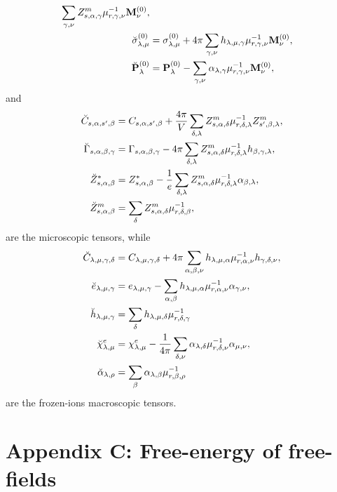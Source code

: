 \documentclass[12pt,a4paper]{article}
\begin{document}
{\begin{align}
\sum_{\gamma,\nu}
Z^m_{s,\alpha,\gamma} \mu^{-1}_{r,\gamma,\nu} {\bf M}^{(0)}_\nu, \\
\breve \sigma^{(0)}_{\lambda,\mu}&= \sigma^{(0)}_{\lambda,\mu}
+ 4 \pi \sum_{\gamma,\nu} h_{\lambda,\mu,\gamma} \mu^{-1}_{r,\gamma,\nu} 
{\bf M}^{(0)}_\nu, \\
\breve {\bf P}^{(0)}_\lambda&= {\bf P}^{(0)}_\lambda -
\sum_{\gamma,\nu} \alpha_{\lambda,\gamma} \mu^{-1}_{r,\gamma,\nu} 
{\bf M}^{(0)}_\nu, \\
\end{align}
and
\begin{align}
\breve C_{s,\alpha,s',\beta} &= C_{s,\alpha,s',\beta}+
{4 \pi \over V}  \sum_{\delta,\lambda} Z^m_{s,\alpha,\delta}
\mu^{-1}_{r,\delta,\lambda}Z^m_{s',\beta,\lambda},\\
\breve \Gamma_{s,\alpha,\beta,\gamma} &= \Gamma_{s,\alpha,\beta,\gamma}
- 4 \pi \sum_{\delta,\lambda} Z^m_{s,\alpha,\delta}
\mu^{-1}_{r,\delta,\lambda} h_{\beta,\gamma,\lambda}, \\
\breve Z^*_{s,\alpha,\beta} &= Z^*_{s,\alpha,\beta}
-{1\over e} \sum_{\delta,\lambda} Z^m_{s,\alpha,\delta} 
\mu^{-1}_{r,\delta,\lambda} \alpha_{\beta,\lambda}, \\
\breve Z^m_{s,\alpha,\beta} &= \sum_{\delta} Z^m_{s,\alpha,\delta} 
\mu^{-1}_{r,\delta,\beta}, 
\end{align}
are the microscopic tensors, while
\begin{align}
\breve C_{\lambda,\mu,\gamma,\delta} &=
C_{\lambda,\mu,\gamma,\delta} + 4 \pi \sum_{\alpha,\beta,\nu}
h_{\lambda,\mu,\alpha} \mu^{-1}_{r,\alpha,\nu} 
h_{\gamma,\delta,\nu}, \\
\breve e_{\lambda,\mu,\gamma}&= e_{\lambda,\mu,\gamma}
-\sum_{\alpha,\beta} h_{\lambda,\mu,\alpha} \mu^{-1}_{r,\alpha,\nu}
\alpha_{\gamma,\nu}, \\
\breve h_{\lambda,\mu,\gamma}&= \sum_\delta h_{\lambda,\mu,\delta}
\mu^{-1}_{r,\delta,\gamma} \\
\breve \chi^e_{\lambda,\mu}&= \chi^e_{\lambda,\mu}
-{1\over 4 \pi} \sum_{\delta,\nu} \alpha_{\lambda,\delta} 
\mu^{-1}_{r,\delta,\nu} \alpha_{\mu,\nu}, \\
\breve \alpha_{\lambda,\rho} &= \sum_\beta \alpha_{\lambda,\beta}
\mu^{-1}_{r,\beta,\rho}
\end{align}
are the frozen-ions macroscopic tensors.
}

\newpage
\section{\color{coral} Appendix C: Free-energy of free-fields }
\end{document}
